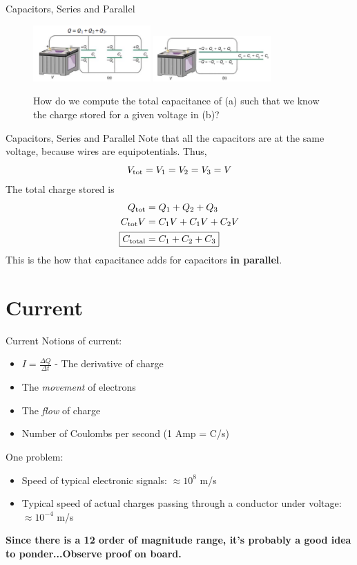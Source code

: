 \documentclass{beamer}
\begin{document}
\begin{frame}{Capacitors, Series and Parallel}
\begin{figure}
\centering
\includegraphics[width=0.4\textwidth]{figures/cap3.png} \hspace{0.2cm}
\includegraphics[width=0.4\textwidth]{figures/cap4.png}
\caption{\label{fig:cap2} How do we compute the total capacitance of (a) such that we know the charge stored for a given voltage in (b)?}
\end{figure}
\end{frame}

\begin{frame}{Capacitors, Series and Parallel}
Note that all the capacitors are at the same voltage, because wires are equipotentials.  Thus,
\begin{equation}
V_{\rm tot} = V_1 = V_2 = V_3 = V
\end{equation}
The total charge stored is
\begin{align}
Q_{\rm tot} &= Q_1 + Q_2 + Q_3 \\
C_{\rm tot} V &= C_1 V + C_1 V + C_2 V \\
\Aboxed{C_{\rm total} &= C_1+C_2+C_3}
\end{align}
This is the how that capacitance adds for capacitors \textbf{in parallel}.
\end{frame}

\section{Current}

\begin{frame}{Current}
\alert{Notions of current:}
\begin{itemize}
	\item $I = \frac{\Delta Q}{\Delta t}$ - The derivative of charge
	\item The \textit{movement} of electrons
	\item The \textit{flow} of charge
	\item Number of Coulombs per second (1 Amp = C/s)
\end{itemize}
\alert{One problem:}
\begin{itemize}
\item Speed of typical electronic signals: $\approx 10^{8}$ m/s
\item Typical speed of actual charges passing through a conductor under voltage: $\approx 10^{-4}$ m/s
\end{itemize}
\textbf{Since there is a 12 order of magnitude range, it's probably a good idea to ponder...\textbf{Observe proof on board.}}
\end{frame}
\end{document}
